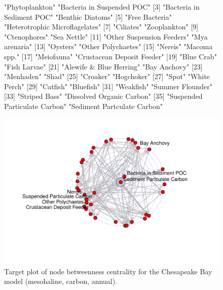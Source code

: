 \documentclass[article]{jss}
\begin{document}
\begin{figure}[!htbp]
  \center
\begin{Schunk}
\begin{Soutput}
 [1] "Phytoplankton"                 "Bacteria in Suspended POC"    
 [3] "Bacteria in Sediment POC"      "Benthic Diatoms"              
 [5] "Free Bacteria"                 "Heterotrophic Microflagelates"
 [7] "Ciliates"                      "Zooplankton"                  
 [9] "Ctenophores"                   "Sea Nettle"                   
[11] "Other Suspension Feeders"      "Mya arenaria"                 
[13] "Oysters"                       "Other Polychaetes"            
[15] "Nereis"                        "Macoma spp."                  
[17] "Meiofauna"                     "Crustacean Deposit Feeder"    
[19] "Blue Crab"                     "Fish Larvae"                  
[21] "Alewife & Blue Herring"        "Bay Anchovy"                  
[23] "Menhaden"                      "Shad"                         
[25] "Croaker"                       "Hogchoker"                    
[27] "Spot"                          "White Perch"                  
[29] "Catfish"                       "Bluefish"                     
[31] "Weakfish"                      "Summer Flounder"              
[33] "Striped Bass"                  "Dissolved Organic Carbon"     
[35] "Suspended Particulate Carbon"  "Sediment Partculate Carbon"   
\end{Soutput}
\end{Schunk}
\includegraphics{enaR-vignette-055}
\caption{Target plot of node betweenness centrality for the Chesapeake
  Bay model (mesohaline, carbon, annual).} \label{fig:target}
\end{figure}
\end{document}
